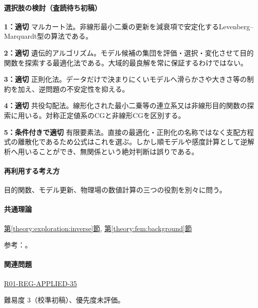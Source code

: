 \paragraph{選択肢の検討（査読待ち初稿）}\mbox{}\par

\noindent\textbf{1：適切} マルカート法。非線形最小二乗の更新を減衰項で安定化するLevenberg–Marquardt型の算法である。\par

\noindent\textbf{2：適切} 遺伝的アルゴリズム。モデル候補の集団を評価・選択・変化させて目的関数を探索する最適化法である。大域的最良解を常に保証するわけではない。\par

\noindent\textbf{3：適切} 正則化法。データだけで決まりにくいモデルへ滑らかさや大きさ等の制約を加え、逆問題の不安定性を抑える。\par

\noindent\textbf{4：適切} 共役勾配法。線形化された最小二乗等の連立系又は非線形目的関数の探索に用いる。対称正定値系のCGと非線形CGを区別する。\par

\noindent\textbf{5：条件付きで適切} 有限要素法。直接の最適化・正則化の名称ではなく支配方程式の離散化であるため公式はこれを選ぶ。しかし順モデルや感度計算として逆解析へ用いることができ、無関係という絶対判断は誤りである。\par

\paragraph{再利用する考え方} 目的関数、モデル更新、物理場の数値計算の三つの役割を別々に問う。

\paragraph{共通理論} \hyperref[theory:exploration:inverse]{第\ref*{theory:exploration:inverse}節}, \hyperref[theory:fem:background]{第\ref*{theory:fem:background}節}

\par 参考：\cite{pygimli_inversion,mit_roy_fea1999}。

\paragraph{関連問題} \hyperref[q:r01-reg-applied-35]{R01-REG-APPLIED-35}

\par 難易度 3（校準初稿）、優先度未評価。

